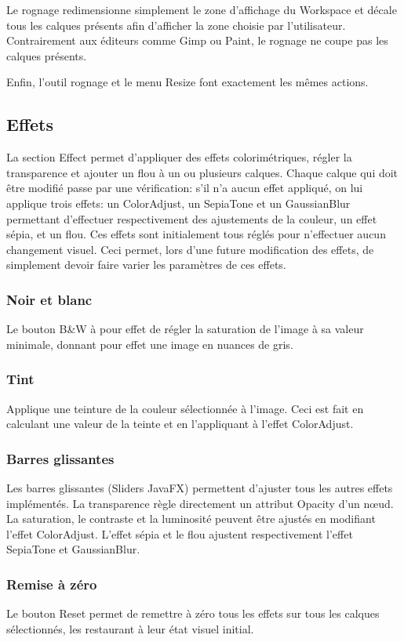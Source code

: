 Le rognage redimensionne simplement le zone d'affichage du Workspace et décale tous les calques présents afin d'afficher la zone choisie par l'utilisateur. Contrairement aux éditeurs comme Gimp ou Paint, le rognage ne coupe pas les calques présents.

Enfin, l'outil rognage et le menu Resize font exactement les mêmes actions.

\subsection{Effets}
La section \og Effect \fg{} permet d'appliquer des effets colorimétriques, régler la transparence et ajouter un flou à un ou plusieurs calques. Chaque calque qui doit être modifié passe par une vérification: s'il n'a aucun effet appliqué, on lui applique trois effets: un ColorAdjust, un SepiaTone et un GaussianBlur permettant d'effectuer respectivement des ajustements de la couleur, un effet sépia, et un flou. Ces effets sont initialement tous réglés pour n'effectuer aucun changement visuel. Ceci permet, lors d'une future modification des effets, de simplement devoir faire varier les paramètres de ces effets.

\subsubsection{Noir et blanc}
Le bouton \og B\&W \fg{} à pour effet de régler la saturation de l'image à sa valeur minimale, donnant pour effet une image en nuances de gris.

\subsubsection{Tint}
Applique une teinture de la couleur sélectionnée à l'image. Ceci est fait en calculant une valeur de la teinte et en l'appliquant à l'effet ColorAdjust.

\subsubsection{Barres glissantes}
Les barres glissantes (\og Sliders \fg{} JavaFX) permettent d'ajuster tous les autres effets implémentés. La transparence règle directement un attribut \og Opacity \fg{} d'un n\oe ud. La saturation, le contraste et la luminosité peuvent être ajustés en modifiant l'effet ColorAdjust. L'effet sépia et le flou ajustent respectivement l'effet SepiaTone et GaussianBlur.

\subsubsection{Remise à zéro}
Le bouton \og Reset \fg{} permet de remettre à zéro tous les effets sur tous les calques sélectionnés, les restaurant à leur état visuel initial.
